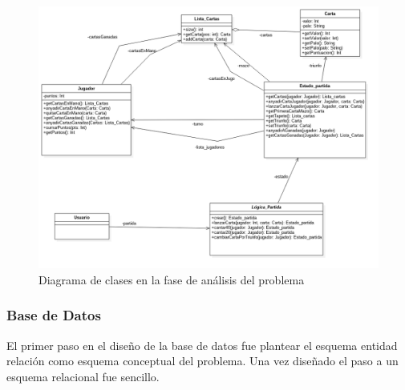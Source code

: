 \begin{figure}[H]
\hspace{-1cm}
\includegraphics[scale = 0.5]{figuras/logica_juego/diagramaClasesDisenyo.png}
\caption{Diagrama de clases en la fase de análisis del problema}
\label{fig:diagramaClasesLogicaJuegoInicial}
\end{figure}



\subsubsection{Base de Datos}
El primer paso en el diseño de la base de datos fue plantear el esquema entidad relación como esquema conceptual del problema. Una vez diseñado el paso a un esquema relacional fue sencillo.


